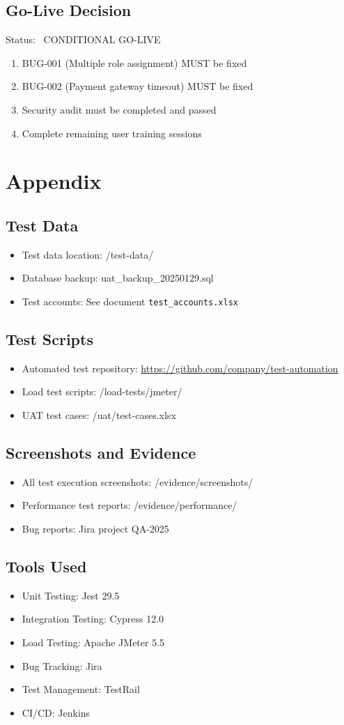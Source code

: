 \documentclass[12pt,a4paper]{article}
\newcommand{\warn}{\ding{115}}
\begin{document}
\subsection{Go-Live Decision}
Status: \warn\ CONDITIONAL GO-LIVE
\begin{enumerate}
  \item BUG-001 (Multiple role assignment) MUST be fixed
  \item BUG-002 (Payment gateway timeout) MUST be fixed
  \item Security audit must be completed and passed
  \item Complete remaining user training sessions
\end{enumerate}

\section{Appendix}
\subsection{Test Data}
\begin{itemize}
  \item Test data location: /test-data/
  \item Database backup: uat\_backup\_20250129.sql
  \item Test accounts: See document \texttt{test\_accounts.xlsx}
\end{itemize}

\subsection{Test Scripts}
\begin{itemize}
  \item Automated test repository: \url{https://github.com/company/test-automation}
  \item Load test scripts: /load-tests/jmeter/
  \item UAT test cases: /uat/test-cases.xlsx
\end{itemize}

\subsection{Screenshots and Evidence}
\begin{itemize}
  \item All test execution screenshots: /evidence/screenshots/
  \item Performance test reports: /evidence/performance/
  \item Bug reports: Jira project QA-2025
\end{itemize}

\subsection{Tools Used}
\begin{itemize}
  \item Unit Testing: Jest 29.5
  \item Integration Testing: Cypress 12.0
  \item Load Testing: Apache JMeter 5.5
  \item Bug Tracking: Jira
  \item Test Management: TestRail
  \item CI/CD: Jenkins
\end{itemize}
\end{document}
